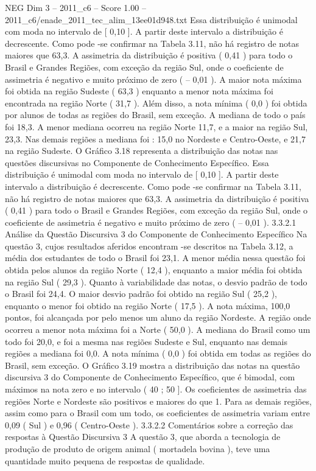 \begin{textsample}{NEG Dim 3 – 2011\_c6 – Score 1.00 – 2011\_c6/enade\_2011\_tec\_alim\_13ee01d948.txt}
Essa distribuição é unimodal com moda no intervalo de [ 0,10 ].
A partir deste intervalo a distribuição é decrescente.
Como pode -se confirmar na Tabela 3.11, não há registro de notas maiores que 63,3.
A assimetria da distribuição é positiva ( 0,41 ) para todo o Brasil e Grandes Regiões, com exceção da região Sul, onde o coeficiente de assimetria é negativo e muito próximo de zero ( – 0,01 ).
A maior nota máxima foi obtida na região Sudeste ( 63,3 ) enquanto a menor nota máxima foi encontrada na região Norte ( 31,7 ).
Além disso, a nota mínima ( 0,0 ) foi obtida por alunos de todas as regiões do Brasil, sem exceção.
A mediana de todo o país foi 18,3.
A menor mediana ocorreu na região Norte 11,7, e a maior na região Sul, 23,3.
Nas demais regiões a mediana foi : 15,0 no Nordeste e Centro-Oeste, e 21,7 na região Sudeste.
O Gráfico 3.18 representa a distribuição das notas nas questões discursivas no Componente de Conhecimento Específico.
Essa distribuição é unimodal com moda no intervalo de [ 0,10 ].
A partir deste intervalo a distribuição é decrescente.
Como pode -se confirmar na Tabela 3.11, não há registro de notas maiores que 63,3.
A assimetria da distribuição é positiva ( 0,41 ) para todo o Brasil e Grandes Regiões, com exceção da região Sul, onde o coeficiente de assimetria é negativo e muito próximo de zero ( – 0,01 ). 3.3.2.1 Análise da Questão Discursiva 3 do Componente de Conhecimento Específico Na questão 3, cujos resultados aferidos encontram -se descritos na Tabela 3.12, a média dos estudantes de todo o Brasil foi 23,1.
A menor média nessa questão foi obtida pelos alunos da região Norte ( 12,4 ), enquanto a maior média foi obtida na região Sul ( 29,3 ).
Quanto à variabilidade das notas, o desvio padrão de todo o Brasil foi 24,4.
O maior desvio padrão foi obtido na região Sul ( 25,2 ), enquanto o menor foi obtido na região Norte ( 17,5 ).
A nota máxima, 100,0 pontos, foi alcançada por pelo menos um aluno da região Nordeste.
A região onde ocorreu a menor nota máxima foi a Norte ( 50,0 ).
A mediana do Brasil como um todo foi 20,0, e foi a mesma nas regiões Sudeste e Sul, enquanto nas demais regiões a mediana foi 0,0.
A nota mínima ( 0,0 ) foi obtida em todas as regiões do Brasil, sem exceção.
O Gráfico 3.19 mostra a distribuição das notas na questão discursiva 3 do Componente de Conhecimento Específico, que é bimodal, com máximos na nota zero e no intervalo ( 40 ; 50 ].
Os coeficientes de assimetria das regiões Norte e Nordeste são positivos e maiores do que 1.
Para as demais regiões, assim como para o Brasil com um todo, os coeficientes de assimetria variam entre 0,09 ( Sul ) e 0,96 ( Centro-Oeste ). 3.3.2.2 Comentários sobre a correção das respostas à Questão Discursiva 3 A questão 3, que aborda a tecnologia de produção de produto de origem animal ( mortadela bovina ), teve uma quantidade muito pequena de respostas de qualidade.

\end{textsample}

